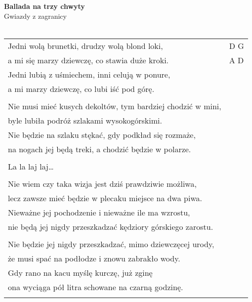 \documentclass[a5paper]{article}
\begin{document}


\noindent
\fontsize{12pt}{15pt}\selectfont
\textbf{Ballada na trzy chwyty} \\
\fontsize{8pt}{10pt}\selectfont
Gwiazdy z zagranicy \\ \\
\fontsize{10pt}{12pt}\selectfont
{}
\begin{tabular}{@{}p{9.5cm}p{3cm}@{}}
\noindent

Jedni wolą brunetki, drudzy wolą blond loki, & D G \\
a mi się marzy dziewczę, co stawia duże kroki. & A D \\
Jedni lubią z uśmiechem, inni celują w ponure, \\
a mi marzy dziewczę, co lubi iść pod górę. \\ \\

Nie musi mieć kusych dekoltów, tym bardziej chodzić w mini, \\
byle lubiła podróż szlakami wysokogórskimi. \\
Nie będzie na szlaku stękać, gdy podkład się rozmaże, \\
na nogach jej będą treki, a chodzić będzie w polarze. \\ \\

\hspace{1cm}La la laj laj… \\ \\

Nie wiem czy taka wizja jest dziś prawdziwie możliwa, \\ 
lecz zawsze mieć będzie w plecaku miejsce na dwa piwa. \\
Nieważne jej pochodzenie i nieważne ile ma wzrostu, \\
nie będą jej nigdy przeszkadzać kędziory górskiego zarostu. \\ \\

Nie będzie jej nigdy przeszkadzać, mimo dziewczęcej urody, \\
że musi spać na podłodze i znowu zabrakło wody. \\
Gdy rano na kacu myślę kurczę, już zginę \\
ona wyciąga pół litra schowane na czarną godzinę. \\ \\


\end{tabular}
\end{document}
